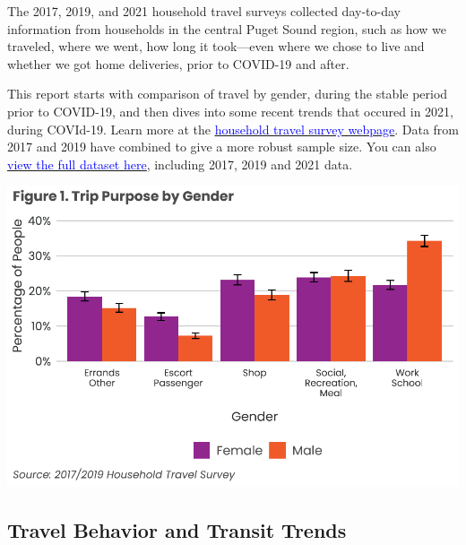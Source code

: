 \documentclass[
  12pt,
]{article}
\begin{document}
\begin{flushleft}
The 2017, 2019, and 2021 household travel surveys collected day-to-day information from households in the central Puget Sound region, such as how we traveled, where we went, how long it took—even where we chose to live and whether we got home deliveries, prior to COVID-19 and after. \smallskip


This report starts with comparison of travel by gender, during the stable period prior to COVID-19, and then dives into some recent trends that occured in 2021, during COVId-19.  Learn more at the \href{https://www.psrc.org/our-work/household-travel-survey-program}{\underline{\textcolor{blue}{household travel survey webpage}}}. Data from 2017 and 2019 have combined to give a more robust sample size.  You can also \href{https://household-travel-survey-psregcncl.hub.arcgis.com}{\underline{\textcolor{blue}{view the full dataset here}}}, including 2017, 2019 and 2021 data. 
\end{flushleft}

\includegraphics{womens_history_story_draft_files/figure-latex/trip by gender-1.pdf}

\hypertarget{travel-behavior-and-transit-trends}{%
\subsection{Travel Behavior and Transit
Trends}\label{travel-behavior-and-transit-trends}}
\end{document}
